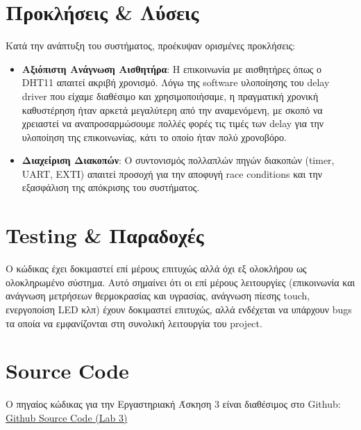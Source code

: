 \documentclass{article}
\begin{document}
\section{Προκλήσεις & Λύσεις}
\label{sec:challenges}
Κατά την ανάπτυξη του συστήματος, προέκυψαν ορισμένες προκλήσεις:
\begin{itemize}
    \item \textbf{Αξιόπιστη Ανάγνωση Αισθητήρα}: Η επικοινωνία με αισθητήρες όπως ο DHT11 απαιτεί ακριβή χρονισμό. Λόγω της software υλοποίησης του delay driver που είχαμε διαθέσιμο και χρησιμοποιήσαμε, η πραγματική χρονική καθυστέρηση ήταν αρκετά μεγαλύτερη από την αναμενόμενη, με σκοπό να χρειαστεί να αναπροσαρμώσουμε πολλές φορές τις τιμές των delay για την υλοποίηση της επικοινωνίας, κάτι το οποίο ήταν πολύ χρονοβόρο.
    \item \textbf{Διαχείριση Διακοπών}: Ο συντονισμός πολλαπλών πηγών διακοπών (timer, UART, EXTI) απαιτεί προσοχή για την αποφυγή race conditions και την εξασφάλιση της απόκρισης του συστήματος.
\end{itemize}

\section{Testing & Παραδοχές}
Ο κώδικας έχει δοκιμαστεί επί μέρους επιτυχώς αλλά όχι εξ ολοκλήρου ως ολοκληρωμένο σύστημα. Αυτό σημαίνει ότι οι επί μέρους λειτουργίες (επικοινωνία και ανάγνωση μετρήσεων θερμοκρασίας και υγρασίας, ανάγνωση πίεσης touch, ενεργοποίση LED κλπ) έχουν δοκιμαστεί επιτυχώς, αλλά ενδέχεται να υπάρχουν bugs τα οποία να εμφανίζονται στη συνολική λειτουργία του project.

\section{Source Code}
Ο πηγαίος κώδικας για την Εργαστηριακή Άσκηση 3 είναι διαθέσιμος στο Github:
\href{https://github.com/charisvt/micro-lab3}{Github Source Code (Lab 3)}
\end{document}
